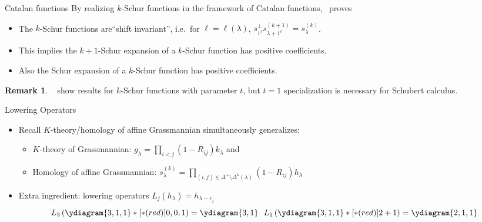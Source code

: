 \documentclass{beamer}
\theoremstyle{definition}
\newtheorem{rmk}[thm]{Remark}
\begin{document}
\begin{frame}{Catalan functions}
  By realizing \(k\)-Schur functions in the framework of Catalan
  functions,~\cite{catalans} proves\pause
  \begin{itemize}
  \item The \(k\)-Schur functions are``shift invariant'', i.e.\ for
    \(\ell = \ell(\lambda)\), \(s_{1^\ell}^\perp
    s_{\lambda+1^\ell}^{(k+1)} = s_\lambda^{(k)}\).\pause
  \item This implies the \(k{+}1\)-Schur expansion of a \(k\)-Schur function has
    positive coefficients. \pause
  \item Also the Schur expansion of a \(k\)-Schur function has positive coefficients.
  \end{itemize}
  \begin{rmk}
   ~\cite{catalans} show results for \(k\)-Schur functions with
   parameter \(t\), but \(t=1\) specialization is necessary for
   Schubert calculus.
  \end{rmk}
\end{frame}
\begin{frame}{Lowering Operators}
  \begin{itemize}
  \item Recall \(K\)-theory/homology of affine Grassmannian
    simultaneously generalizes:
    \begin{itemize}
    \item \(K\)-theory of Grassmannian: \(g_\lambda = \prod_{i < j}
      (1-R_{ij}) k_\lambda\) and \pause
    \item Homology of affine Grassmannian: \(s_\lambda^{(k)} =
      \prod_{(i,j)\in \Delta^+ \setminus \Delta^{k}(\lambda)}
      (1-R_{ij}) h_\lambda\) \pause
    \end{itemize}
  \item Extra ingredient: lowering operators
     \(L_j(h_\lambda) = h_{\lambda-\epsilon_j}\)
            \[ L_3\left( \ydiagram{3,1,1}*[*(red)]{0,0,1} \right) =
              \ydiagram{3,1} \ \ L_{1}\left( \ydiagram{3,1,1}*[*(red)]{2+1} \right)
              = \ydiagram{2,1,1}
              \]
  \end{itemize}
\end{frame}
\end{document}
